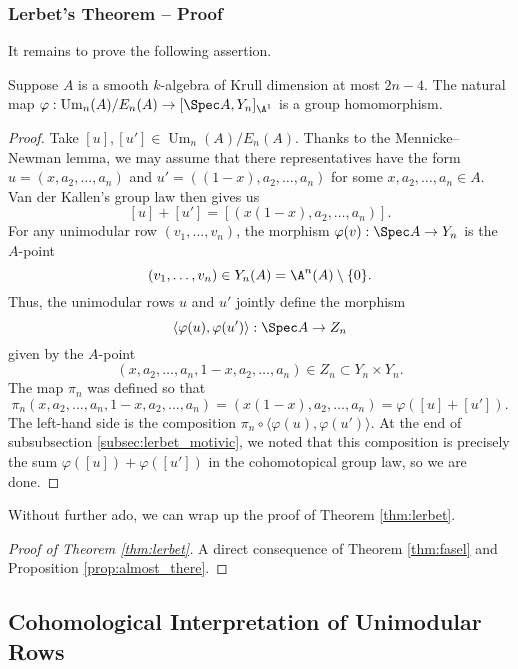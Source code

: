 \subsubsection{Lerbet's Theorem -- Proof}

It remains to prove the following assertion.

\begin{proposition}\label{prop:almost_there}
    Suppose $A$ is a smooth $k$-algebra of Krull dimension at most $2n-4$. The natural map $\varphi: \operatorname{Um}_n(A)/E_n(A) \to [\Spec A, Y_n]_{\A^1}$ is a group homomorphism.
\end{proposition}
\begin{proof}
    Take $[u],[u'] \in \operatorname{Um}_n(A)/E_n(A)$. Thanks to the Mennicke--Newman lemma, we may assume that there representatives have the form $u = (x,a_2,\ldots,a_n)$ and $u' = ((1-x),a_2,\ldots,a_n)$ for some $x,a_2,\ldots,a_n \in A$. Van der Kallen's group law then gives us
    \[
    [u] + [u'] = [(x(1-x),a_2,\ldots,a_n)].
    \]
    For any unimodular row $(v_1,\ldots,v_n)$, the morphism $\varphi(v): \Spec A \to Y_n$ is the $A$-point \[(v_1,\ldots,v_n) \in Y_n(A) = \A^n(A)\setminus\{0\}.\] 
    Thus, the unimodular rows $u$ and $u'$ jointly define the morphism 
    \[
    \langle\varphi(u),\varphi(u')\rangle: \Spec A \to Z_n
    \]
    given by the $A$-point
    \[(x,a_2,\ldots,a_n,1-x,a_2,\ldots,a_n) \in Z_n \subset Y_n \times Y_n.\]
    The map $\pi_n$ was defined so that
    \[\pi_n(x,a_2,\ldots,a_n,1-x,a_2,\ldots,a_n) = (x(1-x),a_2,\ldots,a_n) = \varphi([u] + [u']).\]
    The left-hand side is the composition $\pi_n \circ \langle \varphi(u),\varphi(u')\rangle$. At the end of subsubsection \ref{subsec:lerbet_motivic}, we noted that this composition is precisely the sum $\varphi([u]) + \varphi([u'])$ in the cohomotopical group law, so we are done.
\end{proof}

Without further ado, we can wrap up the proof of Theorem \ref{thm:lerbet}.

\begin{proof}[Proof of Theorem \ref{thm:lerbet}]
    A direct consequence of Theorem \ref{thm:fasel} and Proposition \ref{prop:almost_there}.
\end{proof}

\subsection{Cohomological Interpretation of Unimodular Rows}\label{sec:cohomology}

